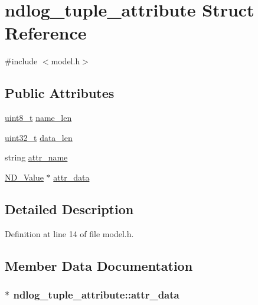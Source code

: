 \hypertarget{structndlog__tuple__attribute}{\section{ndlog\-\_\-tuple\-\_\-attribute Struct Reference}
\label{structndlog__tuple__attribute}
}


{\ttfamily \#include $<$model.\-h$>$}

\subsection*{Public Attributes}
\begin{DoxyCompactItemize}
\item 
\hyperlink{msus_2webserver_2uthash_8h_aba7bc1797add20fe3efdf37ced1182c5}{uint8\-\_\-t} \hyperlink{structndlog__tuple__attribute_a00ae3914e780196c86e1ef9d28968c35}{name\-\_\-len}
\item 
\hyperlink{msus_2webserver_2uthash_8h_a435d1572bf3f880d55459d9805097f62}{uint32\-\_\-t} \hyperlink{structndlog__tuple__attribute_a2f59a569d56f6d3913d1d216a7ab4e2f}{data\-\_\-len}
\item 
string \hyperlink{structndlog__tuple__attribute_ae23fda4bfaa4c39ae7e7ffa4d88f29f0}{attr\-\_\-name}
\item 
\hyperlink{class_n_d___value}{N\-D\-\_\-\-Value} $\ast$ \hyperlink{structndlog__tuple__attribute_aa066f726969bddc4f10e4022af6977d0}{attr\-\_\-data}
\end{DoxyCompactItemize}


\subsection{Detailed Description}


Definition at line 14 of file model.\-h.



\subsection{Member Data Documentation}
\hypertarget{structndlog__tuple__attribute_aa066f726969bddc4f10e4022af6977d0}{
\subsubsection[{attr\-\_\-data}]{$\ast$ ndlog\-\_\-tuple\-\_\-attribute\-::attr\-\_\-data}}\label{structndlog__tuple__attribute_aa066f726969bddc4f10e4022af6977d0}



